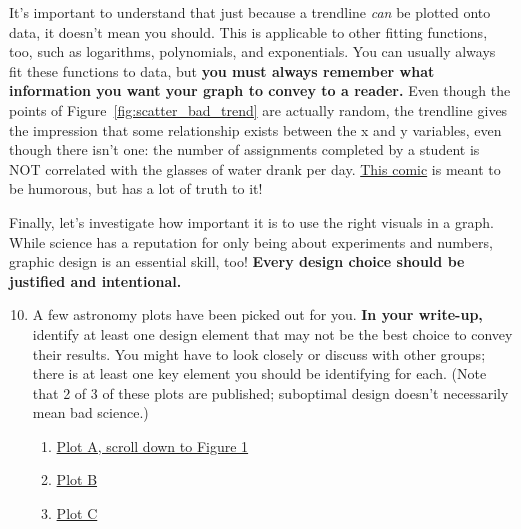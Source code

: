 \documentclass[11pt]{article}%
\begin{document}
It's important to understand that just because a trendline \textit{can} be plotted onto data, it doesn't mean you should. This is applicable to other fitting functions, too, such as logarithms, polynomials, and exponentials. You can usually always fit these functions to data, but \textbf{you must always remember what information you want your graph to convey to a reader.} Even though the points of Figure~\ref{fig:scatter_bad_trend} are actually random, the trendline gives the impression that some relationship exists between the x and y variables, even though there isn't one: the number of assignments completed by a student is NOT correlated with the glasses of water drank per day. \href{https://www.xkcd.com/1725/}{This comic} is meant to be humorous, but has a lot of truth to it!

Finally, let's investigate how important it is to use the right visuals in a graph. While science has a reputation for only being about experiments and numbers, graphic design is an essential skill, too! \textbf{Every design choice should be justified and intentional.}

\begin{enumerate}
    \setcounter{enumi}{9}
    \item A few astronomy plots have been picked out for you. \textbf{In your write-up,} identify at least one design element that may not be the best choice to convey their results. You might have to look closely or discuss with other groups; there is at least one key element you should be identifying for each. (Note that 2 of 3 of these plots are published; suboptimal design doesn't necessarily mean bad science.)
    \begin{enumerate}
        \item \href{https://www.pnas.org/doi/10.1073/pnas.1812905116}{Plot A, scroll down to Figure 1}
        \item \href{https://earthobservatory.nasa.gov/blogs/elegantfigures/wp-content/uploads/sites/4/2010/08/npp_trend_original.png}{Plot B}
        \item \href{https://ibb.co/8DNLBgX}{Plot C}
    \end{enumerate}
\end{enumerate}
    
    
 
\end{document}
